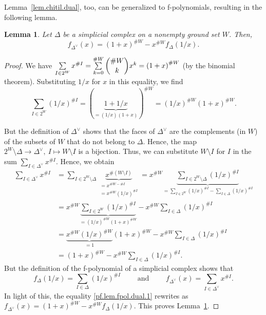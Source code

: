 \documentclass[12pt]{amsart}
\newtheorem{lemma}[theorem]{Lemma}
\theoremstyle{definition}
\newenvironment{verlong}{}{}
\newcommand{\tup}[1]{\left( #1 \right)}
\begin{document}
\begin{verlong}

Lemma~\ref{lem.chitil.dual}, too, can be generalized to f-polynomials,
resulting in the following lemma.

\begin{lemma} \label{lem.fpol.dual}
Let $\Delta$ be a simplicial complex on a nonempty ground set $W$. Then,
\[
f_{\Delta^\vee}\tup{x} = \tup{1+x}^{\# W} - x^{\# W} f_{\Delta}\tup{1/x} .
\]
\end{lemma}

\begin{proof}
We have $\sum\limits_{I \in 2^W} x^{\# I}
= \sum\limits_{k=0}^{\# W} \dbinom{\# W}{k} x^k = \tup{1+x}^{\# W}$
(by the binomial theorem).
Substituting $1/x$ for $x$ in this equality, we find
\[
\sum_{I \in 2^W} \tup{1/x}^{\# I}
= \tup{\underbrace{1+1/x}_{= \tup{1/x} \tup{1+x}}}^{\# W}
= \tup{1/x}^{\# W} \tup{1+x}^{\# W} .
\]

But the definition of $\Delta^\vee$ shows that the faces of $\Delta^\vee$
are the complements (in $W$) of the subsets of $W$ that do not belong to $\Delta$.
Hence, the map $2^W \setminus \Delta \to \Delta^\vee, \  I \mapsto W \setminus I$
is a bijection.
Thus, we can substitute $W \setminus I$ for $I$ in the sum
$\sum\limits_{I \in \Delta^\vee} x^{\# I}$.
Hence, we obtain
\begin{align}
\sum_{I \in \Delta^\vee} x^{\# I}
&= \sum_{I \in 2^W \setminus \Delta} \underbrace{x^{\# \tup{W \setminus I}}}_{\substack{= x^{\# W - \# I} \\ = x^{\# W} \tup{1/x}^{\# I}}}
= x^{\# W} \underbrace{\sum_{I \in 2^W \setminus \Delta} \tup{1/x}^{\# I}}_{= \sum\limits_{I \in 2^W} \tup{1/x}^{\# I}
 - \sum\limits_{I \in \Delta} \tup{1/x}^{\# I}} \nonumber\\
&= x^{\# W} \underbrace{\sum_{I \in 2^W} \tup{1/x}^{\# I}}_{= \tup{1/x}^{\# W} \tup{1+x}^{\# W}}
 - x^{\# W} \sum_{I \in \Delta} \tup{1/x}^{\# I} \nonumber\\
&= \underbrace{x^{\# W}\tup{1/x}^{\# W}}_{= 1} \tup{1+x}^{\# W} - x^{\# W} \sum_{I \in \Delta} \tup{1/x}^{\# I}
\nonumber \\
& = \tup{1+x}^{\# W} - x^{\# W} \sum_{I \in \Delta} \tup{1/x}^{\# I} .
\label{pf.lem.fpol.dual.1}
\end{align}
But the definition of the f-polynomial of a simplicial complex shows that
\[
f_{\Delta}\tup{1/x}
= \sum_{I \in \Delta} \tup{1/x}^{\# I}
\qquad \text{ and } \qquad
f_{\Delta^\vee}\tup{x}
= \sum_{I \in \Delta^\vee} x^{\# I} .
\]
In light of this, the equality \eqref{pf.lem.fpol.dual.1} rewrites as $f_{\Delta^\vee}\tup{x} = \tup{1+x}^{\# W} - x^{\# W} f_{\Delta}\tup{1/x}$. This proves Lemma~\ref{lem.fpol.dual}.
\end{proof}

\end{verlong}
\end{document}
